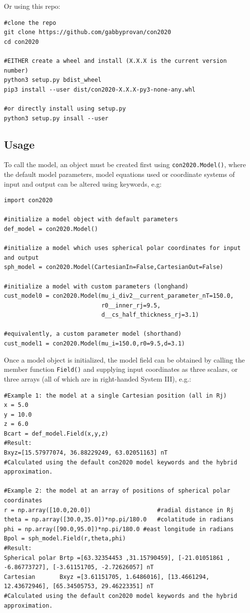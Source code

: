 	Or using this repo:
	
	\begin{verbatim}
#clone the repo
git clone https://github.com/gabbyprovan/con2020
cd con2020
	
#EITHER create a wheel and install (X.X.X is the current version number)
python3 setup.py bdist_wheel
pip3 install --user dist/con2020-X.X.X-py3-none-any.whl
	
#or directly install using setup.py
python3 setup.py insall --user
	\end{verbatim}
	
	\subsection{Usage}
	
	To call the model, an object must be created first using \texttt{con2020.Model()}, where the default model parameters, model equations used or coordinate systems of input and output can be altered using keywords, e.g:
	
	\begin{verbatim}
import con2020
	
#initialize a model object with default parameters
def_model = con2020.Model()
	
#initialize a model which uses spherical polar coordinates for input and output
sph_model = con2020.Model(CartesianIn=False,CartesianOut=False)
	
#initialize a model with custom parameters (longhand)
cust_model0 = con2020.Model(mu_i_div2__current_parameter_nT=150.0,
						   	r0__inner_rj=9.5,
							d__cs_half_thickness_rj=3.1)
	
#equivalently, a custom parameter model (shorthand)
cust_model1 = con2020.Model(mu_i=150.0,r0=9.5,d=3.1)
	\end{verbatim}
	
	Once a model object is initialized, the model field can be obtained by calling the member function \texttt{Field()} and supplying input coordinates as three scalars, or three arrays (all of which are in right-handed System III), e.g.:
	
	\begin{verbatim}
#Example 1: the model at a single Cartesian position (all in Rj)
x = 5.0
y = 10.0
z = 6.0
Bcart = def_model.Field(x,y,z)
#Result:
Bxyz=[15.57977074, 36.88229249, 63.02051163] nT
#Calculated using the default con2020 model keywords and the hybrid approximation.
	
#Example 2: the model at an array of positions of spherical polar coordinates
r = np.array([10.0,20.0])					#radial distance in Rj
theta = np.array([30.0,35.0])*np.pi/180.0	#colatitude in radians 
phi = np.array([90.0,95.0])*np.pi/180.0	#east longitude in radians
Bpol = sph_model.Field(r,theta,phi)
#Result:
Spherical polar Brtp =[63.32354453 ,31.15790459], [-21.01051861 , -6.86773727], [-3.61151705, -2.72626057] nT
Cartesian       Bxyz =[3.61151705, 1.6486016], [13.4661294,  12.43672946], [65.34505753, 29.46223351] nT
#Calculated using the default con2020 model keywords and the hybrid approximation.
	\end{verbatim}
	
